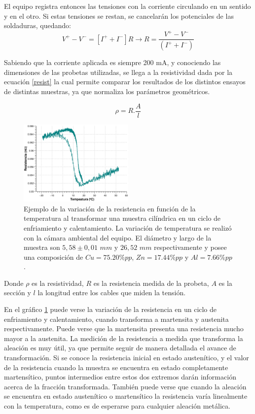 \documentclass[a4paper,12pt,fleqn,twoside,openany]{book}
\begin{document}
El equipo registra entonces las tensiones con la corriente circulando en un sentido y en el otro. Si estas tensiones se restan, se cancelarán los potenciales 
de las soldaduras, quedando:  
\begin{equation}
 V^+ - V^-= [I^+ + I^-] R \longrightarrow R=\frac{V^+ - V^-}{(I^+ + I^-)}
\end{equation}


Sabiendo que la corriente aplicada es siempre 200 mA, y conociendo las dimensiones de las probetas utilizadas, se llega a la resistividad dada por la 
ecuación \ref{resist} la cual permite comparar los resultados de los distintos ensayos de distintas muestras, ya que normaliza los parámetros geométricos.

\begin{equation}
 \rho = R . \frac{A}{l} \label{resist} 
\end{equation}

\begin{figure}
 \centering
 \includegraphics[width=0.5\textwidth]{Img/Resultados/RvsTClavo5.eps}
 \caption{Ejemplo de la variación de la resistencia en función de la temperatura al transformar una muestra cilíndrica en un ciclo de enfriamiento y calentamiento. La variación de temperatura se realizó con la cámara ambiental del equipo. El diámetro y largo de la muestra son $5,58\pm0,01$ $mm$ y $26,52$ $mm$ respectivamente y posee una composición de $Cu=75.20 \% pp$, $Zn= 17.44 \% pp$ y $Al=7.66 \%pp $.} 
 \label{fig:RvsTClavo5}
 \end{figure}


Donde $\rho$ es la resistividad, $R$ es la resistencia medida de la probeta, $A$ es la sección y $l$ la longitud entre los cables que miden la tensión.
 
En el gráfico \ref{fig:RvsTClavo5} puede verse la variación de la resistencia en un ciclo de enfriamiento y calentamiento, cuando transforma a martensita y austenita respectivamente. Puede verse que la martensita presenta una resistencia mucho mayor a la austenita. La medición de la resistencia a medida que transforma la aleación es muy útil, ya que permite seguir 
de manera detallada el avance de transformación. Si se conoce la resistencia inicial en estado austenítico, y el valor de la resistencia cuando la 
muestra se encuentra en estado completamente martensítico, puntos intermedios entre estos dos extremos darán información acerca de la fracción transformada.
También puede verse que cuando la aleación se encuentra en estado austenítico o martensítico la resistencia varía linealmente con la temperatura, como es 
de esperarse para cualquier aleación metálica. 
\end{document}
